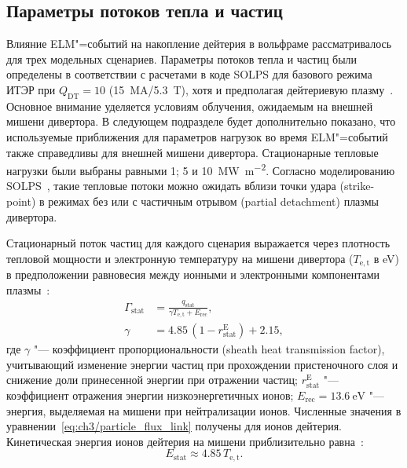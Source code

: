 \subsection{Параметры потоков тепла и частиц}
Влияние ELM"=событий на накопление дейтерия в вольфраме рассматривалось для трех модельных сценариев. Параметры потоков тепла и частиц были определены в соответствии с расчетами в коде SOLPS для базового режима ИТЭР при $Q_\mathrm{DT}=\num{10}$ (\SI{15}{\mega\ampere}/\SI{5.3}{\tesla}), хотя и предполагая дейтериевую плазму~\cite{Pitts2019, Orrico2023}. Основное внимание уделяется условиям облучения, ожидаемым на внешней мишени дивертора. В следующем подразделе будет дополнительно показано, что используемые приближения для параметров нагрузок во время ELM"=событий также справедливы для внешней мишени дивертора. Стационарные тепловые нагрузки были выбраны равными 1; 5 и \SI{10}{\mega\watt\per\meter\squared}. Согласно моделированию SOLPS~\cite{Pitts2019, Orrico2023}, такие тепловые потоки можно ожидать вблизи точки удара (strike-point) в режимах без или с частичным отрывом (partial detachment) плазмы дивертора.

Стационарный поток частиц для каждого сценария выражается через плотность тепловой мощности и электронную температуру на мишени дивертора ($T_{\mathrm{e,t}}$ в \si{\electronvolt}) в предположении равновесия между ионными и электронными компонентами плазмы~\cite{Brida2017, Stangeby2000}:
\begin{subequations}
	\label{eq:ch3/particle_flux_link}
	\begin{align}
		\Gamma_{\mathrm{stat}} & =\frac{q_{\mathrm{stat}}}{\gamma T_{\mathrm{e,t}} + E_{\mathrm{rec}}}, \\
		\gamma                 & =4.85\,(1-r_{\mathrm{stat}}^{\mathrm{E}})+2.15,
	\end{align}
\end{subequations}
где $\gamma$ "--- коэффициент пропорциональности (sheath heat transmission factor), учитывающий изменение энергии частиц при прохождении пристеночного слоя и снижение доли принесенной энергии при отражении частиц; $r_{\mathrm{stat}}^{\mathrm{E}}$ "--- коэффициент отражения энергии низкоэнергетичных ионов; $E_{\mathrm{rec}}=\SI{13.6}{\electronvolt}$ "--- энергия, выделяемая на мишени при нейтрализации ионов. Численные значения в уравнении~\cref{eq:ch3/particle_flux_link} получены для ионов дейтерия. Кинетическая энергия ионов дейтерия на мишени приблизительно равна~\cite{Brida2017}:
\begin{equation}
	\label{eq:ch3/stat_energy}
	E_{\mathrm{stat}}\approx 4.85\, T_{\mathrm{e,t}}.
\end{equation}

